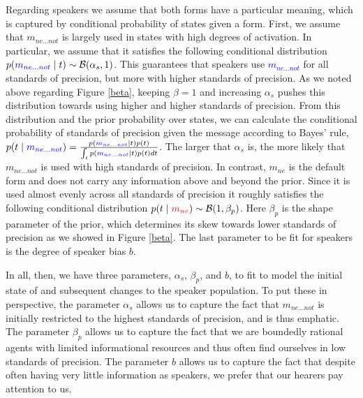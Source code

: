\documentclass[linguex]{sp}
\theoremstyle{definition} \newtheorem{definition}{Definition}
\begin{document}
Regarding speakers we assume that both forms have a particular meaning, which is captured by conditional probability of states given a form. First, we assume that \textit{\color{blue} $m_{ne...not}$} is largely used in states with high degrees of activation. In particular, we assume that it satisfies the following conditional distribution $p(\textcolor{blue}{m_{ne...not}} \mid t ) \sim \mathcal{B}(\alpha_{s}, 1)$.  This guarantees that speakers use \textcolor{blue}{$m_{ne...not}$} for all standards of precision, but more with higher standards of precision. As we noted above regarding Figure \ref{beta}, keeping $\beta=1$ and increasing $\alpha_s$ pushes this distribution towards using higher and higher standards of precision. From this distribution and the prior probability over states, we can calculate the conditional probability of standards of precision given the message according to Bayes' rule, $p(t \mid \textcolor{blue}{m_{ne...not}}) = \frac{p(\textcolor{blue}{m_{ne...not}} \mid t ) p(t)}{\int_t p(\textcolor{blue}{m_{ne...not}} \mid t ) p(t)dt}$. The larger that $\alpha_{s}$ is, the more likely that \textit{\color{blue} $m_{ne...not}$} is used with high standards of precision.  In contrast, \textit{\color{red} $m_{ne}$} is the default form and does not carry any information above and beyond the prior. Since it is used almost evenly across all standards of precision it roughly satisfies the following conditional distribution $p(t \mid \textit{\color{red} $m_{ne}$}) \sim \mathcal B (1, \beta_p)$. Here $\beta_p$ is the shape parameter of the prior, which determines its skew towards lower standards of precision as we showed in Figure \ref{beta}. The last parameter to be fit for speakers is the degree of speaker bias $b$.



In all, then, we have three parameters, $\alpha_{s}$, $\beta_p$, and $b$, to fit to model the initial state of and subsequent changes to the speaker population. To put these in perspective, the parameter $\alpha_{s}$ allows us to capture the fact that \textit{\color{blue} $m_{ne...not}$} is initially restricted to the highest standards of precision, and is thus emphatic. The parameter $\beta_p$ allows us to capture the fact that we are boundedly rational agents with limited informational resources and thus often find ourselves in low standards of precision. The parameter $b$ allows us to capture the fact that despite often having very little information as speakers, we prefer that our hearers pay attention to us.
\end{document}

